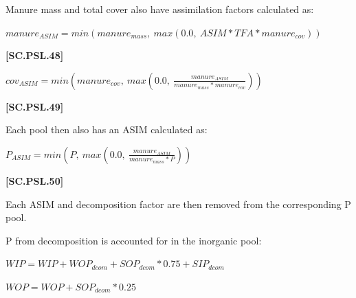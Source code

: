 Manure mass and total cover also have assimilation factors calculated as: 
            \vspace{0.5cm}
        
    \begin{center}
\(manure_{ASIM} = min(manure_{mass},\ max(0.0,\ ASIM * TFA*manure_{cov})) \)
    \end{center}
        \vspace{0.5cm} 
    
            {\raggedleft \textbf{[SC.PSL.48]}\par}
            \vspace{0.5cm}
        
    \begin{center}
\(cov_{ASIM} = min(manure_{cov},\ max(0.0,\ \frac{manure_{ASIM}}{manure_{mass} * manure_{cov}})) \)
    \end{center}
        \vspace{0.5cm} 
    
            {\raggedleft \textbf{[SC.PSL.49]}\par}
            \vspace{0.5cm}

Each pool then also has an ASIM calculated as:
            \vspace{0.5cm}
        
    \begin{center}
\(P_{ASIM} = min(P,\ max(0.0,\ \frac{manure_{ASIM}}{manure_{mass} * P})) \)
    \end{center}
        \vspace{0.5cm} 
    
            {\raggedleft \textbf{[SC.PSL.50]}\par}
            \vspace{0.5cm}

Each ASIM and decomposition factor are then removed from the corresponding P pool.
\vspace{0.25cm}

P from decomposition is accounted for in the inorganic pool:
            \vspace{0.5cm}
        
    \begin{center}
\(WIP=WIP+WOP_{dcom}+SOP_{dcom} * 0.75+SIP_{dcom}\)
\vspace{0.1cm}

\(WOP=WOP+SOP_{dcom} * 0.25\)
    \end{center}
        \vspace{0.5cm} 
    
